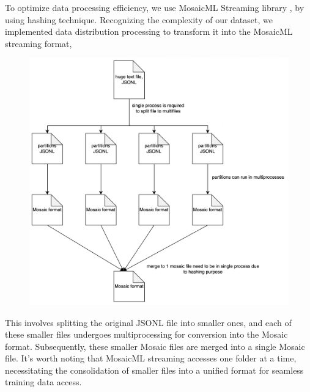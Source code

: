 \documentclass{article}
\begin{document}
To optimize data processing efficiency, we use MosaicML Streaming library \cite{mosaicml2022streaming}, by using hashing technique. Recognizing the complexity of our dataset, we implemented data distribution processing to transform it into the MosaicML streaming format,

\begin{figure}[h]
  \centering
  \includegraphics[width=0.6\linewidth]{pic/how-to-mosaic.png} %
\end{figure}

This involves splitting the original JSONL file into smaller ones, and each of these smaller files undergoes multiprocessing for conversion into the Mosaic format. Subsequently, these smaller Mosaic files are merged into a single Mosaic file. It's worth noting that MosaicML streaming accesses one folder at a time, necessitating the consolidation of smaller files into a unified format for seamless training data access.

{}

\end{document}
